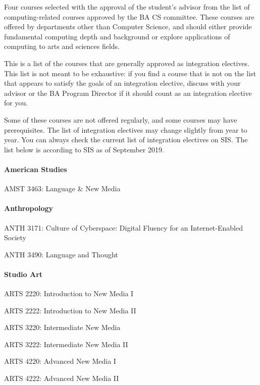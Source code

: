 Four courses selected with the approval of the student's advisor from
the list of computing-related courses approved by the BA CS
committee. These courses are offered by departments other than
Computer Science, and should either provide fundamental computing
depth and background or explore applications of computing to arts and
sciences fields. 

This is a list of the courses that are generally approved as
integration electives. This list is not meant to be exhaustive: if you
find a course that is not on the list that appears to satisfy the
goals of an integration elective, discuss with your advisor or the BA
Program Director if it should count as an integration elective for
you.

Some of these courses are not offered regularly, and some courses may
have prerequisites. The list of integration electives may change
slightly from year to year.  You can always check the current list of
integration electives on SIS.  The list below is according to SIS as
of September 2019.

\paragraph{American Studies}
\begin{itemlist}
\item AMST 3463: Language & New Media
\end{itemlist}

\paragraph{Anthropology}
\begin{itemlist}
\item ANTH 3171: Culture of Cyberspace: Digital Fluency for an Internet-Enabled Society
\item ANTH 3490: Language and Thought
\end{itemlist}


\paragraph{Studio Art}
\begin{itemlist}
\item ARTS 2220: Introduction to New Media I
\item ARTS 2222: Introduction to New Media II
\item ARTS 3220: Intermediate New Media 
\item ARTS 3222: Intermediate New Media II
\item ARTS 4220: Advanced New Media I
\item ARTS 4222: Advanced New Media II
\end{itemlist}

